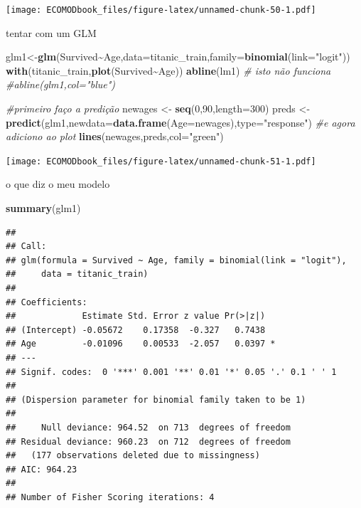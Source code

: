 \documentclass[
]{book}
\newenvironment{Shaded}{\begin{snugshade}}{\end{snugshade}}
\newcommand{\AttributeTok}[1]{\textcolor[rgb]{0.13,0.29,0.53}{#1}}
\newcommand{\CommentTok}[1]{\textcolor[rgb]{0.56,0.35,0.01}{\textit{#1}}}
\newcommand{\DecValTok}[1]{\textcolor[rgb]{0.00,0.00,0.81}{#1}}
\newcommand{\FunctionTok}[1]{\textcolor[rgb]{0.13,0.29,0.53}{\textbf{#1}}}
\newcommand{\NormalTok}[1]{#1}
\newcommand{\OtherTok}[1]{\textcolor[rgb]{0.56,0.35,0.01}{#1}}
\newcommand{\SpecialCharTok}[1]{\textcolor[rgb]{0.81,0.36,0.00}{\textbf{#1}}}
\newcommand{\StringTok}[1]{\textcolor[rgb]{0.31,0.60,0.02}{#1}}
\begin{document}
\texttt{[image: ECOMODbook\_files/figure-latex/unnamed-chunk-50-1.pdf]}

tentar com um GLM

\begin{Shaded}
\begin{Highlighting}[]
\NormalTok{glm1}\OtherTok{\textless{}{-}}\FunctionTok{glm}\NormalTok{(Survived}\SpecialCharTok{\textasciitilde{}}\NormalTok{Age,}\AttributeTok{data=}\NormalTok{titanic\_train,}\AttributeTok{family=}\FunctionTok{binomial}\NormalTok{(}\AttributeTok{link=}\StringTok{"logit"}\NormalTok{))}
\FunctionTok{with}\NormalTok{(titanic\_train,}\FunctionTok{plot}\NormalTok{(Survived}\SpecialCharTok{\textasciitilde{}}\NormalTok{Age))}
\FunctionTok{abline}\NormalTok{(lm1)}
\CommentTok{\# isto não funciona}
\CommentTok{\#abline(glm1,col="blue")}

\CommentTok{\#primeiro faço a predição}
\NormalTok{newages }\OtherTok{\textless{}{-}} \FunctionTok{seq}\NormalTok{(}\DecValTok{0}\NormalTok{,}\DecValTok{90}\NormalTok{,}\AttributeTok{length=}\DecValTok{300}\NormalTok{)}
\NormalTok{preds }\OtherTok{\textless{}{-}} \FunctionTok{predict}\NormalTok{(glm1,}\AttributeTok{newdata=}\FunctionTok{data.frame}\NormalTok{(}\AttributeTok{Age=}\NormalTok{newages),}\AttributeTok{type=}\StringTok{"response"}\NormalTok{)}
\CommentTok{\#e agora adiciono ao plot}
\FunctionTok{lines}\NormalTok{(newages,preds,}\AttributeTok{col=}\StringTok{"green"}\NormalTok{)}
\end{Highlighting}
\end{Shaded}

\texttt{[image: ECOMODbook\_files/figure-latex/unnamed-chunk-51-1.pdf]}

o que diz o meu modelo

\begin{Shaded}
\begin{Highlighting}[]
\FunctionTok{summary}\NormalTok{(glm1)}
\end{Highlighting}
\end{Shaded}

\begin{verbatim}
## 
## Call:
## glm(formula = Survived ~ Age, family = binomial(link = "logit"), 
##     data = titanic_train)
## 
## Coefficients:
##             Estimate Std. Error z value Pr(>|z|)  
## (Intercept) -0.05672    0.17358  -0.327   0.7438  
## Age         -0.01096    0.00533  -2.057   0.0397 *
## ---
## Signif. codes:  0 '***' 0.001 '**' 0.01 '*' 0.05 '.' 0.1 ' ' 1
## 
## (Dispersion parameter for binomial family taken to be 1)
## 
##     Null deviance: 964.52  on 713  degrees of freedom
## Residual deviance: 960.23  on 712  degrees of freedom
##   (177 observations deleted due to missingness)
## AIC: 964.23
## 
## Number of Fisher Scoring iterations: 4
\end{verbatim}
\end{document}
